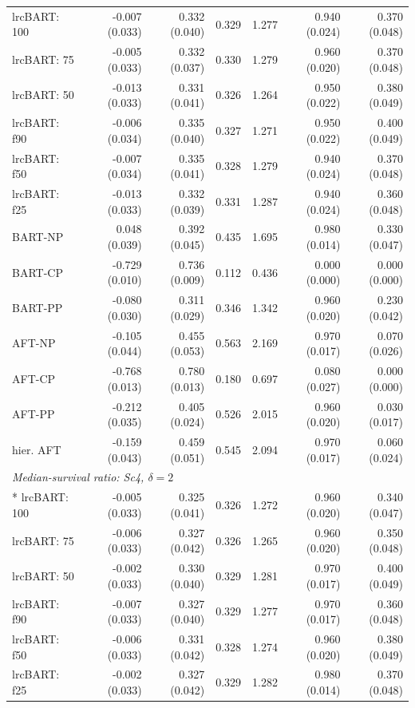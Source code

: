 \begin{landscape}
\begin{longtable}{lrrrrrr}
lrcBART: 100 & -0.007 (0.033) & 0.332 (0.040) & 0.329 & 1.277 & 0.940 (0.024) & 0.370 (0.048) \\
lrcBART: 75 & -0.005 (0.033) & 0.332 (0.037) & 0.330 & 1.279 & 0.960 (0.020) & 0.370 (0.048) \\
lrcBART: 50 & -0.013 (0.033) & 0.331 (0.041) & 0.326 & 1.264 & 0.950 (0.022) & 0.380 (0.049) \\
lrcBART: f90 & -0.006 (0.034) & 0.335 (0.040) & 0.327 & 1.271 & 0.950 (0.022) & 0.400 (0.049) \\
lrcBART: f50 & -0.007 (0.034) & 0.335 (0.041) & 0.328 & 1.279 & 0.940 (0.024) & 0.370 (0.048) \\
lrcBART: f25 & -0.013 (0.033) & 0.332 (0.039) & 0.331 & 1.287 & 0.940 (0.024) & 0.360 (0.048) \\
BART-NP & 0.048 (0.039) & 0.392 (0.045) & 0.435 & 1.695 & 0.980 (0.014) & 0.330 (0.047) \\
BART-CP & -0.729 (0.010) & 0.736 (0.009) & 0.112 & 0.436 & 0.000 (0.000) & 0.000 (0.000) \\
BART-PP & -0.080 (0.030) & 0.311 (0.029) & 0.346 & 1.342 & 0.960 (0.020) & 0.230 (0.042) \\
AFT-NP & -0.105 (0.044) & 0.455 (0.053) & 0.563 & 2.169 & 0.970 (0.017) & 0.070 (0.026) \\
AFT-CP & -0.768 (0.013) & 0.780 (0.013) & 0.180 & 0.697 & 0.080 (0.027) & 0.000 (0.000) \\
AFT-PP & -0.212 (0.035) & 0.405 (0.024) & 0.526 & 2.015 & 0.960 (0.020) & 0.030 (0.017) \\
hier. AFT & -0.159 (0.043) & 0.459 (0.051) & 0.545 & 2.094 & 0.970 (0.017) & 0.060 (0.024) \\
\multicolumn{7}{l}{\strut\textit{Median-survival ratio: Sc4, $\delta=2$}}\\*
lrcBART: 100 & -0.005 (0.033) & 0.325 (0.041) & 0.326 & 1.272 & 0.960 (0.020) & 0.340 (0.047) \\
lrcBART: 75 & -0.006 (0.033) & 0.327 (0.042) & 0.326 & 1.265 & 0.960 (0.020) & 0.350 (0.048) \\
lrcBART: 50 & -0.002 (0.033) & 0.330 (0.040) & 0.329 & 1.281 & 0.970 (0.017) & 0.400 (0.049) \\
lrcBART: f90 & -0.007 (0.033) & 0.327 (0.040) & 0.329 & 1.277 & 0.970 (0.017) & 0.360 (0.048) \\
lrcBART: f50 & -0.006 (0.033) & 0.331 (0.042) & 0.328 & 1.274 & 0.960 (0.020) & 0.380 (0.049) \\
lrcBART: f25 & -0.002 (0.033) & 0.327 (0.042) & 0.329 & 1.282 & 0.980 (0.014) & 0.370 (0.048) \\

\end{longtable}
\end{landscape}
